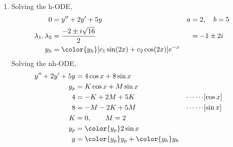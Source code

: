 \begin{enumerate}
    \item Solving the h-ODE,
          \begin{align}
              0                        & = y'' + 2y' + 5y                                    & a & = 2, \quad b = 5 \\
              \lambda_{1}, \lambda_{2} & = \frac{-2 \pm i\sqrt{16}}{2}                       &   & = -1 \pm 2i      \\
              y_{h}                    & = \color{y_h} [c_{1}\sin(2x) + c_{2}\cos(2x)]e^{-x}
          \end{align}
          Solving the nh-ODE,
          \begin{align}
              y'' + 2y' + 5y & = 4\cos x + 8\sin x                                                   \\
              y_{p}          & = K \cos x + M \sin x                                                 \\
              4              & = -K + 2M + 5K                              & \cdots\cdots & [\cos x] \\
              8              & = -M - 2K + 5M                              & \cdots\cdots & [\sin x] \\
              K              & = 0, \qquad M = 2                                                     \\
              y_{p}          & = \color{y_p} 2\sin x                                                 \\
              y              & = {\color{y_p} y_{p}} + {\color{y_h} y_{h}}
          \end{align}


\end{enumerate}
